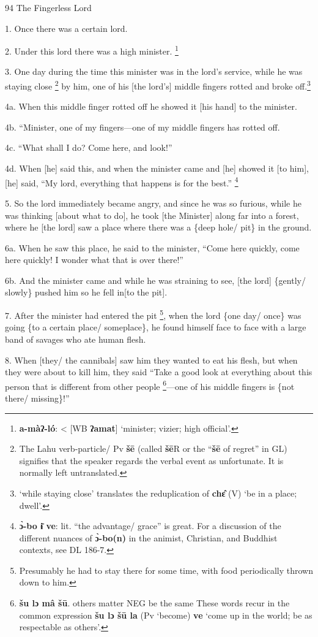 
94 The Fingerless Lord

1. Once there was a certain lord.

2. Under this lord there was a high minister. \footnote{\textbf{a-màʔ-ló}: < [WB \textbf{ʔamat}] `minister; vizier; high official'.}

3. One day during the time this minister was in the lord's service, while he was
staying close \footnote{The Lahu verb-particle/ Pv \textbf{šē} (called \textbf{šē}R or the ``\textbf{šē} of regret'' in GL) signifies that the speaker regards the verbal event as unfortunate. It is normally left untranslated.} by him, one of his [the lord's] middle fingers rotted and broke
off.\footnote{`while staying close' translates the reduplication of \textbf{chɛ̂} (V) `be in a place; dwell'.}

4a. When this middle finger rotted off he showed it [his hand] to the minister.

4b. ``Minister, one of my fingers---one of my middle fingers has rotted off.

4c. ``What shall I do? Come here, and look!''

4d. When [he] said this, and when the minister came and [he] showed it [to him],
[he] said, ``My lord, everything that happens is for the best.'' \footnote{\textbf{ɔ̀-bo ɨ̄ ve}: lit. ``the advantage/ grace'' is great. For a discussion of the different nuances of \textbf{ɔ̀-bo(n)} in the animist, Christian, and Buddhist contexts, see DL 186-7.}

5. So the lord immediately became angry, and since he was so furious, while he
was thinking [about what to do], he took [the Minister] along far into a forest,
where he [the lord] saw a place where there was a \{deep hole/ pit\} in the ground.

6a. When he saw this place, he said to the minister, ``Come here quickly, come
here quickly!  I wonder what that is over there!''

6b. And the minister came and while he was straining to see, [the lord] \{gently/
slowly\} pushed him so he fell in[to the pit].

7. After the minister had entered the pit \footnote{Presumably he had to stay there for some time, with food periodically thrown down to him.}, when the lord \{one day/ once\}
was going \{to a certain place/ someplace\}, he found himself face to face with
a large band of savages who ate human flesh.

8. When [they/ the cannibals] saw him they wanted to eat his flesh, but when they
were about to kill him, they said ``Take a good look at everything about this person
that is different from other people \footnote{\textbf{šu lɔ  mâ  šū}.  others matter  NEG be the same  These words recur in the common expression \textbf{šu lɔ šū la }(Pv `become)\textbf{ ve} `come up in the world; be as respectable as others'.}---one of his middle fingers is \{not there/
missing\}!''

